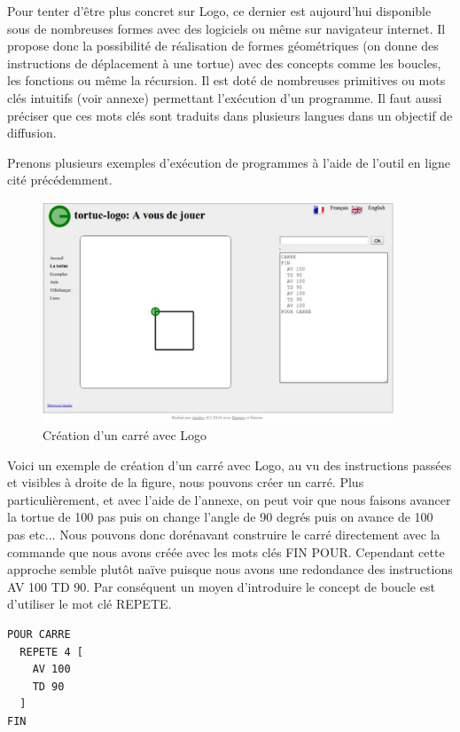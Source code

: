 Pour tenter d'être plus concret sur Logo, ce dernier est aujourd'hui disponible sous de nombreuses formes avec des logiciels ou même sur navigateur internet. \cite{15} \cite{16} Il propose donc la possibilité de réalisation de formes géométriques (on donne des instructions de déplacement à une tortue) avec des concepts comme les boucles, les fonctions ou même la récursion. Il est doté de nombreuses primitives ou mots clés intuitifs (voir annexe) permettant l'exécution d'un programme. Il faut aussi préciser que ces mots clés sont traduits dans plusieurs langues dans un objectif de diffusion.

Prenons plusieurs exemples d'exécution de programmes à l'aide de l'outil en ligne cité précédemment.

\begin{figure}[!htb]
  \centering
  \includegraphics[width=105mm,scale=0.5]{images/logo1.png}
  \caption{Création d'un carré avec Logo}
  \label{fig:boat1}
\end{figure}

Voici un exemple de création d'un carré avec Logo, au vu des instructions passées et visibles à droite de la figure, nous pouvons créer un carré. Plus particulièrement, et avec l'aide de l'annexe, on peut voir que nous faisons avancer la tortue de 100 pas puis on change l'angle de 90 degrés puis on avance de 100 pas etc... Nous pouvons donc dorénavant construire le carré directement avec la commande que nous avons créée avec les mots clés FIN POUR. Cependant cette approche semble plutôt naïve puisque nous avons une redondance des instructions AV 100 TD 90. Par conséquent un moyen d'introduire le concept de boucle est d'utiliser le mot clé REPETE.

\begin{lstlisting}[frame=single]
POUR CARRE
  REPETE 4 [
    AV 100
    TD 90
  ]
FIN
\end{lstlisting}

